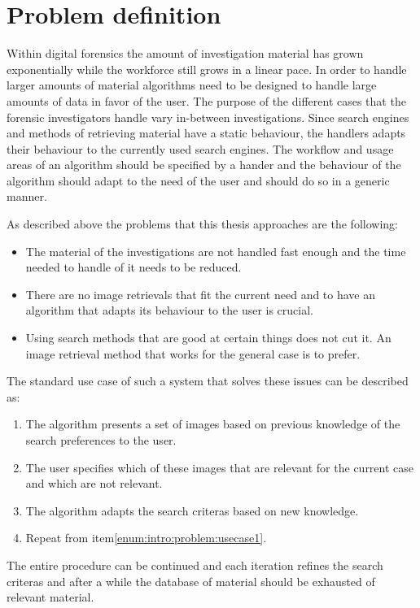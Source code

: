 \section{Problem definition}
Within digital forensics the amount of investigation material has grown exponentially while the workforce still grows in a linear pace. In order to handle larger amounts of material algorithms need to be designed to handle large amounts of data in favor of the user. The purpose of the different cases that the forensic investigators handle vary in-between investigations. Since search engines and methods of retrieving material have a static behaviour, the handlers adapts their behaviour to the currently used search engines. The workflow and usage areas of an algorithm should be specified by a hander and the behaviour of the algorithm should adapt to the need of the user and should do so in a generic manner. 

As described above the problems that this thesis approaches are the following:
\begin{itemize}
	\item The material of the investigations are not handled fast enough and the time needed to handle of it needs to be reduced.
	\item There are no image retrievals that fit the current need and to have an algorithm that adapts its behaviour to the user is crucial.
	\item Using search methods that are good at certain things does not cut it. An image retrieval method that works for the general case is to prefer.
\end{itemize}

The standard use case of such a system that solves these issues can be described as:
\begin{enumerate}
	\item \label{enum:intro:problem:usecase1} The algorithm presents a set of images based on previous knowledge of the search preferences to the user. 
	\item The user specifies which of these images that are relevant for the current case and which are not relevant. 
	\item The algorithm adapts the search criteras based on new knowledge.
	\item Repeat from item\ref{enum:intro:problem:usecase1}.
\end{enumerate}

The entire procedure can be continued and each iteration refines the search criteras and after a while the database of material should be exhausted of relevant material.
